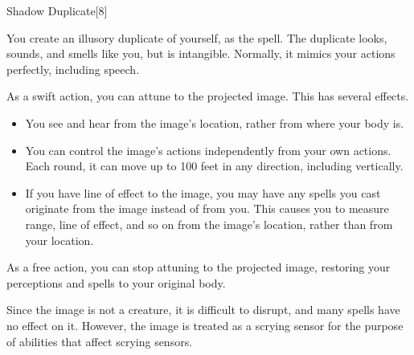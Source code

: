 \begin{spellsection}{Shadow Duplicate}[8]
    \begin{spellheader}
    \end{spellheader}
    \begin{spellcontent}
        \begin{spelltargetinginfo}
            \spellrng{\rngmed}
        \end{spelltargetinginfo}
        \begin{spelleffects}
            \spelleffect You create an illusory duplicate of yourself, as the  spell. The duplicate looks, sounds, and smells like you, but is intangible. Normally, it mimics your actions perfectly, including speech.
            \par As a swift action, you can attune to the projected image. This has several effects.
            \begin{itemize}
                \item You see and hear from the image's location, rather from where your body is.
                \item You can control the image's actions independently from your own actions. Each round, it can move up to 100 feet in any direction, including vertically.
                \item If you have line of effect to the image, you may have any spells you cast originate from the image instead of from you.
                    This causes you to measure range, line of effect, and so on from the image's location, rather than from your location.
            \end{itemize}

            As a free action, you can stop attuning to the projected image, restoring your perceptions and spells to your original body.

            \spelldur \durlong \dismissable
        \end{spelleffects}
    \end{spellcontent}
    \begin{spellfooter}
        \spellnotes Since the image is not a creature, it is difficult to disrupt, and many spells have no effect on it.
        However, the image is treated as a scrying sensor for the purpose of abilities that affect scrying sensors.
        \miscastexplode
    \end{spellfooter}
\end{spellsection}

